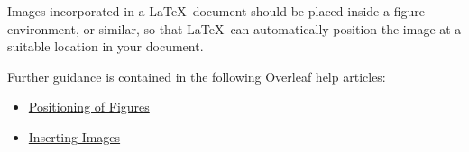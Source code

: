 Images incorporated in a \LaTeX\ document should be placed inside a figure environment, or similar, so that \LaTeX\ can automatically position the image at a suitable location in your document.

Further guidance is contained in the following Overleaf help articles:

\begin{itemize}
    \item \href{https://www.overleaf.com/learn/latex/Positioning_of_Figures}{Positioning of Figures}
    \item \href{https://www.overleaf.com/learn/latex/Inserting_Images}{Inserting Images}
\end{itemize}
